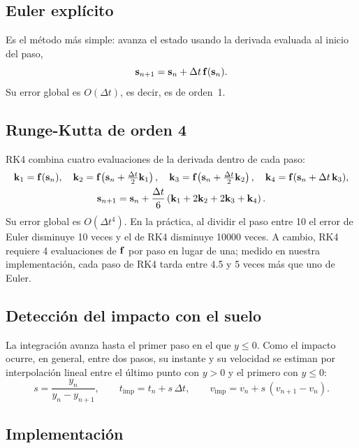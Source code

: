 \subsection{Euler explícito}

Es el método más simple: avanza el estado usando la derivada evaluada al inicio del paso,
\begin{equation}
  \mathbf{s}_{n+1} = \mathbf{s}_n + \Delta t\, \mathbf{f}(\mathbf{s}_n).
\end{equation}
Su error global es $O(\Delta t)$, es decir, es de orden~1.

\subsection{Runge-Kutta de orden 4}

RK4 combina cuatro evaluaciones de la derivada dentro de cada paso:
\begin{gather}
  \mathbf{k}_1 = \mathbf{f}(\mathbf{s}_n), \quad
  \mathbf{k}_2 = \mathbf{f}\!\left(\mathbf{s}_n + \tfrac{\Delta t}{2}\mathbf{k}_1\right), \quad
  \mathbf{k}_3 = \mathbf{f}\!\left(\mathbf{s}_n + \tfrac{\Delta t}{2}\mathbf{k}_2\right), \quad
  \mathbf{k}_4 = \mathbf{f}(\mathbf{s}_n + \Delta t\,\mathbf{k}_3), \\
  \mathbf{s}_{n+1} = \mathbf{s}_n + \frac{\Delta t}{6}\left(\mathbf{k}_1 + 2\mathbf{k}_2 + 2\mathbf{k}_3 + \mathbf{k}_4\right).
\end{gather}
Su error global es $O(\Delta t^4)$. En la práctica, al dividir el paso entre 10 el error de Euler disminuye 10 veces y el de RK4 disminuye \num{10000} veces. A cambio, RK4 requiere 4 evaluaciones de $\mathbf{f}$ por paso en lugar de una; medido en nuestra implementación, cada paso de RK4 tarda entre 4.5 y 5 veces más que uno de Euler.

\subsection{Detección del impacto con el suelo}

La integración avanza hasta el primer paso en el que $y \le 0$. Como el impacto ocurre, en general, entre dos pasos, su instante y su velocidad se estiman por interpolación lineal entre el último punto con $y > 0$ y el primero con $y \le 0$:
\begin{equation}
  s = \frac{y_n}{y_n - y_{n+1}}, \qquad
  t_{\text{imp}} = t_n + s\,\Delta t, \qquad
  v_{\text{imp}} = v_n + s\,(v_{n+1} - v_n).
\end{equation}

\subsection{Implementación}

